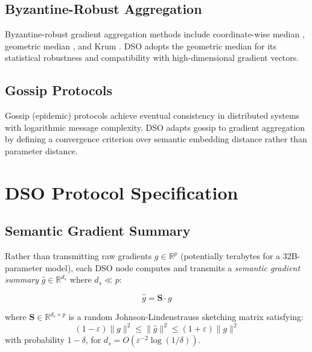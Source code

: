 \documentclass[11pt,a4paper]{article}
\begin{document}
\subsection{Byzantine-Robust Aggregation}

Byzantine-robust gradient aggregation methods include coordinate-wise median
\cite{yin2018byzantine}, geometric median \cite{chen2017distributed}, and Krum
\cite{blanchard2017machine}. DSO adopts the geometric median for its statistical
robustness and compatibility with high-dimensional gradient vectors.

\subsection{Gossip Protocols}

Gossip (epidemic) protocols \cite{kermarrec2007gossiping} achieve eventual consistency
in distributed systems with logarithmic message complexity. DSO adapts gossip to
gradient aggregation by defining a convergence criterion over semantic embedding distance
rather than parameter distance.

\section{DSO Protocol Specification}
\label{sec:protocol}

\subsection{Semantic Gradient Summary}

Rather than transmitting raw gradients $g \in \mathbb{R}^p$ (potentially terabytes
for a 32B-parameter model), each DSO node computes and transmits a \emph{semantic
gradient summary} $\hat{g} \in \mathbb{R}^{d_s}$ where $d_s \ll p$:

\begin{equation}
    \hat{g} = \mathbf{S} \cdot g
    \label{eq:sketch}
\end{equation}

where $\mathbf{S} \in \mathbb{R}^{d_s \times p}$ is a random Johnson-Lindenstrauss
sketching matrix satisfying:
\begin{equation}
    (1 - \varepsilon)\|g\|^2 \leq \|\hat{g}\|^2 \leq (1+\varepsilon)\|g\|^2
    \label{eq:jl}
\end{equation}
with probability $1 - \delta$, for $d_s = O(\varepsilon^{-2} \log(1/\delta))$.
\end{document}
